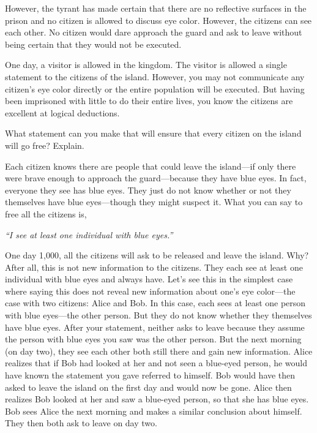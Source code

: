 \documentclass[11pt,letterpaper]{article}
\begin{document}
However, the tyrant has made certain that there are no reflective surfaces in the prison and no citizen is allowed to discuss eye color. However, the citizens can see each other. No citizen would dare approach the guard and ask to leave without being certain that they would not be executed. 

One day, a visitor is allowed in the kingdom. The visitor is allowed a single statement to the citizens of the island. However, you may not communicate any citizen's eye color directly or the entire population will be executed. But having been imprisoned with little to do their entire lives, you know the citizens are excellent at logical deductions. 

What statement can you make that will ensure that every citizen on the island will go free? Explain. \pspace

\sol Each citizen knows there are people that could leave the island---if only there were brave enough to approach the guard---because they have blue eyes. In fact, everyone they see has blue eyes. They just do not know whether or not they themselves have blue eyes---though they might suspect it. What you can say to free all the citizens is, \pspace

\hfill {\itshape ``I see at least one individual with blue eyes.''} \hfill \phantom{.} \pspace

One day 1,000, all the citizens will ask to be released and leave the island. Why? After all, this is not new information to the citizens. They each see at least one individual with blue eyes and always have. Let's see this in the simplest case where saying this does not reveal new information about one's eye color---the case with two citizens: Alice and Bob. In this case, each sees at least one person with blue eyes---the other person. But they do not know whether they themselves have blue eyes. After your statement, neither asks to leave because they assume the person with blue eyes you saw was the other person. But the next morning (on day two), they see each other both still there and gain new information. Alice realizes that if Bob had looked at her and not seen a blue-eyed person, he would have known the statement you gave referred to himself. Bob would have then asked to leave the island on the first day and would now be gone. Alice then realizes Bob looked at her and saw a blue-eyed person, so that she has blue eyes. Bob sees Alice the next morning and makes a similar conclusion about himself. They then both ask to leave on day two. \pspace
\end{document}
